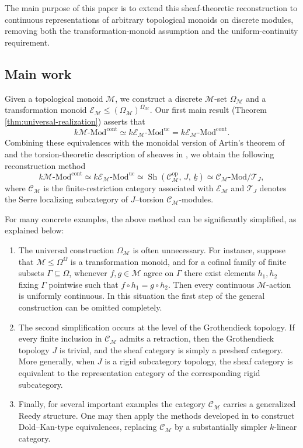 \documentclass[10pt, reqno]{amsart}
\theoremstyle{plain}
\numberwithin{equation}{section}
\theoremstyle{definition}
\newcommand{\Sh}{\operatorname{Sh}}
\newcommand{\Mod}{{\textrm{-}\mathrm{Mod}}}
\newcommand{\op}{\mathrm{op}}
\newcommand{\M}{\mathscr M}
\newcommand{\E}{\mathscr E}
\newcommand{\C}{\mathscr C}
\newcommand{\T}{\mathcal T}
\begin{document}
The main purpose of this paper is to extend this sheaf-theoretic reconstruction to continuous representations of arbitrary topological monoids on discrete modules, removing both the transformation-monoid assumption and
the uniform-continuity requirement.

\subsection{Main work}

Given a topological monoid $\M$, we construct a discrete $\M$-set $\Omega_{\M}$ and a transformation monoid $\E_{\M} \leqslant (\Omega_{\M})^{\Omega_\M}$. Our first main result (Theorem \ref{thm:universal-realization}) asserts that
\[
k\M\Mod^{\mathrm{cont}} \simeq k\E_{\M} \Mod^{\mathrm{uc}} = k\E_{\M} \Mod^{\mathrm{cont}}.
\]
Combining these equivalences with the monoidal version of Artin's theorem of \cite{LiRel} and the torsion-theoretic description of sheaves in \cite{DLL}, we obtain the following reconstruction method
\[
k\M\Mod^{\mathrm{cont}} \simeq k\E_{\M}\Mod^{\mathrm{uc}} \simeq \Sh(\C_{\M}^{\op}, \, J, \, \underline{k}) \simeq \C_{\M}\Mod/\T_J,
\]
where $\C_{\M}$ is the finite-restriction category associated with $\E_{\M}$ and $\T_J$ denotes the Serre localizing subcategory of $J$--torsion $\C_{\M}$-modules.

For many concrete examples, the above method can be significantly simplified, as explained below:
\begin{enumerate}
\item The universal construction $\Omega_{\M}$ is often unnecessary. For instance, suppose that $\M \leqslant \Omega^{\Omega}$ is a transformation monoid, and for a cofinal family of finite subsets $\Gamma \subseteq \Omega$, whenever $f, g \in \M$ agree on $\Gamma$ there exist elements $h_1, h_2$ fixing $\Gamma$ pointwise such that $f \circ h_1 = g \circ h_2$. Then every continuous $\M$-action is uniformly continuous. In this situation the first step of the general construction can be omitted completely.

\item The second simplification occurs at the level of the Grothendieck topology. If every finite inclusion in $\C_\M$ admits a retraction, then the Grothendieck topology $J$ is trivial, and the sheaf category is simply a presheaf category. More generally, when $J$ is a rigid subcategory topology, the sheaf category is equivalent to the representation category of the corresponding rigid subcategory.

\item Finally, for several important examples the category $\C_\M$ carries a generalized Reedy structure. One may then apply the methods developed in \cite{LiHom, LiNorm} to construct Dold--Kan-type equivalences, replacing $\C_\M$ by a substantially simpler $k$-linear category.
\end{enumerate}
\end{document}
